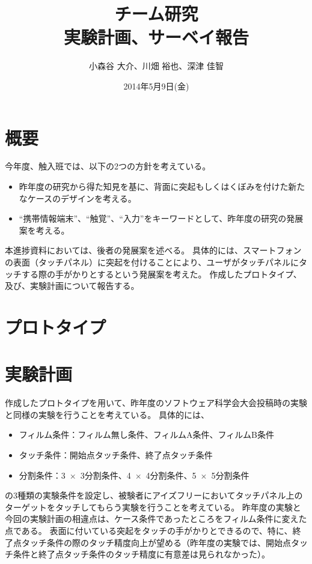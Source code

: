 \documentclass[11pt,a4paper]{jarticle}
\title{{チーム研究\\実験計画、サーベイ報告}}
\date{2014年5月9日(金)}
\author{小森谷 大介、川畑 裕也、深津 佳智}
\begin{document}
\maketitle

\section{概要}
今年度、触入班では、以下の2つの方針を考えている。
\begin{itemize}
	\item 昨年度の研究から得た知見を基に、背面に突起もしくはくぼみを付けた新たなケースのデザインを考える。
	\item ``携帯情報端末''、``触覚''、``入力''をキーワードとして、昨年度の研究の発展案を考える。
\end{itemize}
本進捗資料においては、後者の発展案を述べる。
具体的には、スマートフォンの表面（タッチパネル）に突起を付けることにより、ユーザがタッチパネルにタッチする際の手がかりとするという発展案を考えた。
作成したプロトタイプ、及び、実験計画について報告する。

\section{プロトタイプ}

\section{実験計画}
作成したプロトタイプを用いて、昨年度のソフトウェア科学会大会投稿時の実験と同様の実験を行うことを考えている。
具体的には、
\begin{itemize}
	\item フィルム条件：フィルム無し条件、フィルムA条件、フィルムB条件
	\item タッチ条件：開始点タッチ条件、終了点タッチ条件
	\item 分割条件：3~$\times$~3分割条件、4~$\times$~4分割条件、5~$\times$~5分割条件
\end{itemize}
の3種類の実験条件を設定し、被験者にアイズフリーにおいてタッチパネル上のターゲットをタッチしてもらう実験を行うことを考えている。
昨年度の実験と今回の実験計画の相違点は、ケース条件であったところをフィルム条件に変えた点である。
表面に付いている突起をタッチの手がかりとできるので、特に、終了点タッチ条件の際のタッチ精度向上が望める（昨年度の実験では、開始点タッチ条件と終了点タッチ条件のタッチ精度に有意差は見られなかった）。
\end{document}

